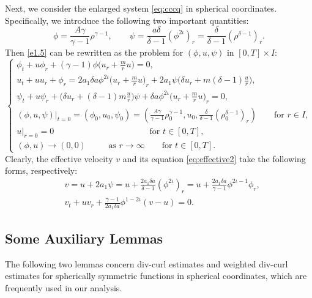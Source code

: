 \documentclass[11pt,reqno]{amsart}
\numberwithin{rk}{section}
\numberwithin{prop}{section}
\numberwithin{mydef}{section}
\numberwithin{lem}{section}
\numberwithin{equation}{section}
\numberwithin{thm}{section}
\begin{document}
Next, we consider the enlarged system \eqref{eq:cccq} in spherical coordinates. 
Specifically, we introduce the following two important quantities: 
\begin{equation}\label{tr}
\phi=\frac{A\gamma}{\gamma-1}\rho^{\gamma-1}, \qquad \psi=\frac{a\delta}{\delta-1}(\phi^{2\iota})_r=\frac{\delta}{\delta-1}(\rho^{\delta-1})_r.
 \end{equation}
Then \eqref{e1.5} can be rewritten as the problem for $(\phi,u,\psi)$ in $[0,T]\times I$:
\begin{equation}\label{e2.2}
\begin{cases}
\displaystyle \phi_t+u\phi_r+(\gamma-1)\phi\big(u_r+ \frac{m}{r}u\big)=0,\\[4pt]
\displaystyle u_t+u u_r+\phi_r=2a_1\delta a\phi^{2\iota}\big(u_r+ \frac{m}{r}u\big)_r+2a_1 \psi\big(\delta u_r+m(\delta-1)\frac{u}{r}\big),\\[4pt]
\displaystyle \psi_t+u\psi_r+\big(\delta u_r+(\delta-1)m\frac{u}{r}\big)\psi+\delta a\phi^{2\iota}\big(u_r+\frac{m}{r}u\big)_r=0,\\[4pt]
\displaystyle  (\phi,u,\psi)|_{t=0}=(\phi_0,u_0,\psi_0)
=(\frac{A\gamma}{\gamma-1}\rho_0^{\gamma-1},u_0,\frac{\delta}{\delta-1}(\rho_0^{\delta-1})_r) \qquad\text{for $r\in I$},\\[4pt]
\displaystyle u|_{r=0}=0 \qquad\qquad\qquad\qquad\qquad\quad \,\text{for $t\in [0,T]$},\\[4pt]
\displaystyle  (\phi,u)\to (0,0) \qquad \,\ \ \text{as $r\to\infty$}  \qquad \text{for $t\in [0,T]$}.
\end{cases}
\end{equation}
Clearly, the effective velocity $v$ and its equation \eqref{eq:effective2} take the following forms, respectively:
\begin{align}
&v=u+2a_1 \psi=u+\frac{2a_1 \delta  a}{\delta-1}(\phi^{2\iota})_r=u+\frac{2a_1\delta a}{\gamma-1}\phi^{2\iota-1}\phi_r,\label{v-express-2}\\
&v_t+uv_r+\frac{\gamma-1}{2a_1 \delta  a}\phi^{1-2\iota}(v-u)=0.\label{eq:effective1}
\end{align}





\subsection{Some Auxiliary Lemmas}
The following two lemmas concern div-curl estimates and weighted div-curl estimates for spherically symmetric functions in spherical coordinates, which are frequently used in our analysis. 
\end{document}
